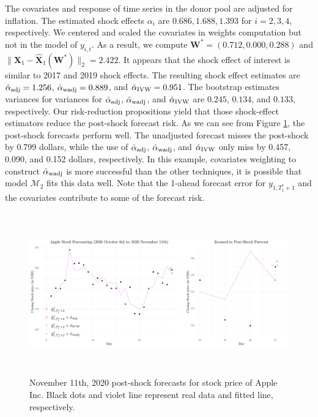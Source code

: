 \documentclass[11pt,3p,review,authoryear]{elsarticle}
\def\mbf#1{\mathbf{#1}} %
\def\mc#1{\mathcal{#1}} %
\theoremstyle{definition}
\begin{document}
The covariates and response of time series in the donor pool are adjusted for inflation. The estimated shock effects $\alpha_i$ are $0.686, 1.688, 1.393$ for $i = 2, 3, 4$, respectively. We centered and scaled the covariates in weights computation but not in the model of $y_{i,t}$. As a result, we compute $\mathbf{W}^* = (0.712, 0.000, 0.288)$ and $
  \|\mbf{X}_1-\hat{\mbf{X}}_1(\mbf{W}^*)\|_2 = 2.422$. It appears that  the shock effect of interest is similar to 2017 and 2019 shock effects. The resulting shock effect estimates are $\hat{\alpha}_{\rm adj}= 1.256$, $\hat{\alpha}_{\rm wadj}=0.889$, and $\hat{\alpha}_{\rm IVW} = 0.951$. The bootstrap estimates variances for variances for $\hat{\alpha}_{\rm adj}$, $\hat{\alpha}_{\rm wadj}$,  and $\hat{\alpha}_{\rm IVW}$ are $0.245$, $0.134$, and $0.133$, respectively. Our risk-reduction propositions yield that those shock-effect estimators reduce the post-shock forecast risk. As we can see from Figure \ref{Fig3}, the post-shock forecasts perform well. The unadjusted forecast misses the post-shock by 0.799 dollars, while the use of $\hat{\alpha}_{\rm adj}$, $\hat{\alpha}_{\rm wadj}$, and $\hat{\alpha}_{\rm IVW}$ only miss by 0.457, 0.090, and 0.152 dollars, respectively. In this example, covariates weighting to construct $\hat{\alpha}_{\rm wadj}$ is more successful than the other techniques, it is possible that model $\mc{M}_2$ fits this data well. Note  that the 1-ahead forecast error for $y_{1, T_1^*+1}$ and the covariates contribute to some of the forecast risk.

\begin{figure}[t!]
  \begin{center}
    \includegraphics[height = 7cm, width = 16.8cm]{FIG3.pdf}
    \caption{November 11th, 2020 post-shock forecasts for stock price of Apple Inc. Black dots and violet line represent real data and fitted line, respectively.}
    \label{Fig3}
  \end{center}  
  \vspace{-.6cm}
\end{figure}
\end{document}
